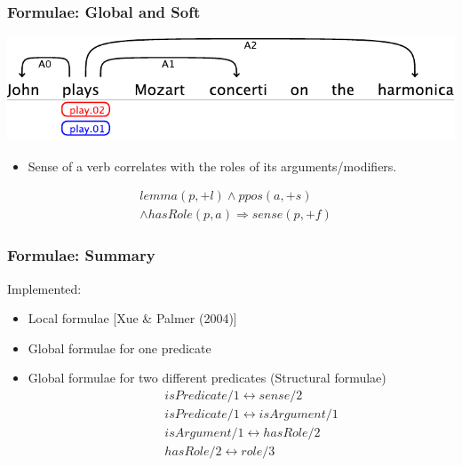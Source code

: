 \documentclass{beamer} \setbeamertemplate{navigation symbols}{}
\begin{document}
\begin{frame}
  \frametitle{Formulae: Global and Soft}
  \begin{center}
    \includegraphics[scale=.70]{example-1}
  \end{center}

  \begin{itemize}
  \item Sense of a verb correlates with the roles of its
    arguments/modifiers.
  \end{itemize}

  \begin{eqnarray*}
    & lemma(p,+l) \wedge ppos(a,+s)  \\
    & \wedge hasRole(p,a)  \Rightarrow sense(p,+f) 
  \end{eqnarray*}

\end{frame}


\begin{frame}
  \frametitle{Formulae: Summary}

  Implemented: 
  \begin{itemize}
  \item Local formulae [Xue \& Palmer (2004)]
  \item Global formulae for one predicate
  \item Global formulae for two different predicates (Structural formulae)\\
      \begin{eqnarray*} & & isPredicate/1 \leftrightarrow sense/2 \\ 
         & & isPredicate/1 \leftrightarrow isArgument/1 \\
         & & isArgument/1 \leftrightarrow hasRole/2  \\
         & & hasRole/2 \leftrightarrow role/3 \\
      \end{eqnarray*}
  \end{itemize}
\end{frame}
\end{document}

